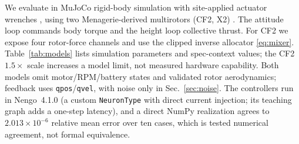 We evaluate in MuJoCo rigid-body simulation with site-applied actuator wrenches
\cite{todorov2012mujoco}, using two Menagerie-derived multirotors (CF2, X2)
\cite{menagerieModels}. The attitude loop commands body torque and the height loop
collective thrust. For CF2 we expose four rotor-force channels and use the clipped
inverse allocator \eqref{eq:mixer}. Table~\ref{tab:models} lists simulation parameters and
spec-context values; the CF2 $1.5\times$ scale increases a model limit, not measured
hardware capability. Both models omit motor/RPM/battery states and validated rotor
aerodynamics; feedback uses \texttt{qpos}/\texttt{qvel}, with noise only in Sec.~\ref{sec:noise}. The controllers run in Nengo~4.1.0 (a custom \texttt{NeuronType} with direct current injection; its teaching graph adds a one-step latency), and a direct NumPy realization agrees to $2.013\times10^{-6}$ relative mean error over ten cases, which is tested numerical agreement, not formal equivalence.

